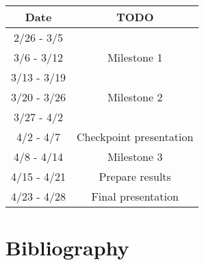 \documentclass[12pt,letterpaper]{article}
\begin{document}
\begin{center}
\begin{tabular}{ c | c }
\bf{Date} & \bf{TODO} \\ \hline
2/26 - 3/5 &  \\
3/6 - 3/12 &  Milestone 1\\
3/13 - 3/19 &  \\
3/20 - 3/26 &  Milestone 2\\
3/27 - 4/2 &  \\
4/2 - 4/7 & Checkpoint presentation\\
4/8 - 4/14 & Milestone 3\\
4/15 - 4/21 & Prepare results\\
4/23 - 4/28 & Final presentation
\end{tabular}
\end{center}

\section{Bibliography}






\end{document}
